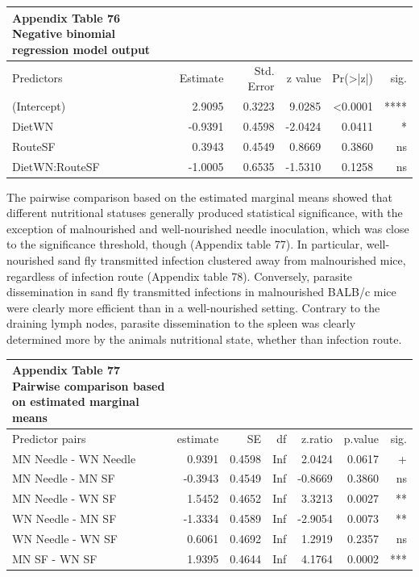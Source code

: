 \documentclass[
  12pt,
  letterpaper,
]{article}
\begin{document}
\begingroup
\fontsize{12.0pt}{14.4pt}\selectfont
\begin{longtable}{l|rrrrr}
\caption*{
{\large \textbf{Appendix Table 76}} \\ 
{\small \textbf{Negative binomial regression model output}}
} \\ 
\toprule
Predictors & {Estimate} & {Std. Error} & {z value} & {Pr(>|z|)} & {sig.} \\ 
\midrule\addlinespace[2.5pt]
(Intercept) & 2.9095 & 0.3223 & 9.0285 & <0.0001 & **** \\ 
DietWN & -0.9391 & 0.4598 & -2.0424 & 0.0411 & * \\ 
RouteSF & 0.3943 & 0.4549 & 0.8669 & 0.3860 & ns \\ 
DietWN:RouteSF & -1.0005 & 0.6535 & -1.5310 & 0.1258 & ns \\ 
\bottomrule
\end{longtable}
\endgroup

The pairwise comparison based on the estimated marginal means showed that different nutritional statuses generally produced statistical significance, with the exception of malnourished and well-nourished needle inoculation, which was close to the significance threshold, though (Appendix table 77). In particular, well-nourished sand fly transmitted infection clustered away from malnourished mice, regardless of infection route (Appendix table 78). Conversely, parasite dissemination in sand fly transmitted infections in malnourished BALB/c mice were clearly more efficient than in a well-nourished setting. Contrary to the draining lymph nodes, parasite dissemination to the spleen was clearly determined more by the animals nutritional state, whether than infection route.

\begingroup
\fontsize{12.0pt}{14.4pt}\selectfont
\begin{longtable}{l|rrrrrr}
\caption*{
{\large \textbf{Appendix Table 77}} \\ 
{\small \textbf{Pairwise comparison based on estimated marginal means}}
} \\ 
\toprule
Predictor pairs & {estimate} & {SE} & {df} & {z.ratio} & {p.value} & {sig.} \\ 
\midrule\addlinespace[2.5pt]
MN Needle - WN Needle & 0.9391 & 0.4598 & Inf & 2.0424 & 0.0617 & + \\ 
MN Needle - MN SF & -0.3943 & 0.4549 & Inf & -0.8669 & 0.3860 & ns \\ 
MN Needle - WN SF & 1.5452 & 0.4652 & Inf & 3.3213 & 0.0027 & ** \\ 
WN Needle - MN SF & -1.3334 & 0.4589 & Inf & -2.9054 & 0.0073 & ** \\ 
WN Needle - WN SF & 0.6061 & 0.4692 & Inf & 1.2919 & 0.2357 & ns \\ 
MN SF - WN SF & 1.9395 & 0.4644 & Inf & 4.1764 & 0.0002 & *** \\ 
\bottomrule
\end{longtable}
\endgroup
\end{document}
